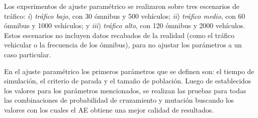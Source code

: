 
Los experimentos de ajuste paramétrico se realizaron sobre tres escenarios de tráfico: \emph{i}) \emph{tráfico bajo}, con 30 ómnibus y 500 vehículos; \emph{ii}) \emph{tráfico medio}, con 60 ómnibus y 1000 vehículos; y \emph{iii}) \emph{tráfico alto}, con 120 ómnibus y 2000 vehículos. Estos escenarios no incluyen datos recabados de la realidad (como el tráfico vehicular o la frecuencia de los ómnibus), para no ajustar los parámetros a un caso particular.

En el ajuste paramétrico los primeros parámetros que se definen son: el tiempo de simulación, el criterio de parada y el tamaño de población. Luego de establecidos los valores para los parámetros mencionados, se realizan las pruebas para todas las combinaciones de probabilidad de cruzamiento y mutación buscando los valores con los cuales el AE obtiene una mejor calidad de resultados.






